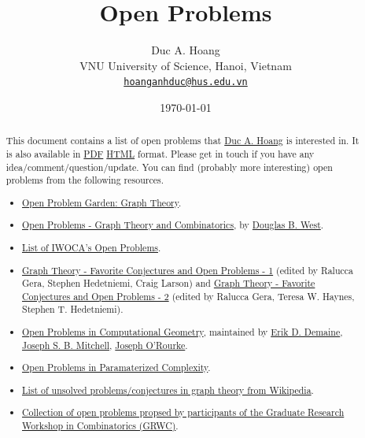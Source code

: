 \documentclass[a4paper]{article}
\title{}
\author{}
\date{\today}
\title{\textbf{Open Problems}}
\author{Duc A. Hoang\\ VNU University of Science, Hanoi, Vietnam\\ \href{mailto:hoanganhduc@hus.edu.vn}{\texttt{hoanganhduc@hus.edu.vn}}}
\theoremstyle{definition}
\theoremstyle{remark}
\numberwithin{equation}{section}
\begin{document}
\nocite{*}


\maketitle

\begin{abstract}
This document contains a list of open problems that \href{https://hoanganhduc.github.io/}{Duc A. Hoang} is interested in.  
It is also available in
%
\iflatexml 
\href{https://hoanganhduc.github.io/problems/main.pdf}{PDF} 
\else 
\href{https://hoanganhduc.github.io/problems/}{HTML} 
\fi%
format.
Please get in touch if you have any idea/comment/question/update.
%
You can find (probably more interesting) open problems from the following resources.
\begin{itemize}
	\item \href{http://www.openproblemgarden.org/category/graph_theory}{Open Problem Garden: Graph Theory}.
	\item \href{https://faculty.math.illinois.edu/~west/openp/}{Open Problems - Graph Theory and Combinatorics}, by \href{https://math.uiuc.edu/~west/}{Douglas B. West}.
	\item \href{https://nms.kcl.ac.uk/iwoca/problems_list.html}{List of IWOCA's Open Problems}.
	\item \href{https://link.springer.com/book/10.1007/978-3-319-31940-7}{Graph Theory - Favorite Conjectures and Open Problems - 1} (edited by Ralucca Gera, Stephen Hedetniemi, Craig Larson) and \href{https://link.springer.com/book/10.1007/978-3-319-97686-0}{Graph Theory - Favorite Conjectures and Open Problems - 2} (edited by Ralucca Gera, Teresa W. Haynes, Stephen T. Hedetniemi).
	\item \href{https://topp.openproblem.net}{Open Problems in Computational Geometry}, maintained by \href{http://erikdemaine.org/}{Erik D. Demaine}, \href{http://www.ams.sunysb.edu/~jsbm/}{Joseph S. B. Mitchell}, \href{http://cs.smith.edu/~orourke/}{Joseph O’Rourke}.
	\item \href{http://fpt.wikidot.com/open-problems}{Open Problems in Paramaterized Complexity}.
	\item \href{https://en.wikipedia.org/wiki/Category:Unsolved_problems_in_graph_theory}{List of unsolved problems/conjectures in graph theory from Wikipedia}.
	\item \href{https://sites.google.com/view/grwc/problem-garden}{Collection of open problems propsed by participants of the Graduate Research Workshop in Combinatorics (GRWC)}.
\end{itemize}

\end{abstract}
\end{document}
